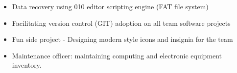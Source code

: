 \documentclass[11pt,a4paper,sans]{moderncv}        %
\begin{document}
{\begin{itemize}
\begin{itemize}
  \item Developing statistical algorithms for extraction and interpretation of spectral features in acoustic data 
  \item Database design
  \item HMI design
  \item Interactive data visualisation
  \item Performance improvement by utilizing parallel/GPU/cluster computing with Matlab tools
  \end{itemize}
\item Data recovery using 010 editor scripting engine (FAT file system)
\item Facilitating  version control (GIT) adoption on all team software projects
\item Fun side project - Designing modern style icons and insignia for the team
\item Maintenance officer: maintaining  computing and electronic equipment inventory.
\end{itemize}
}

\end{document}
